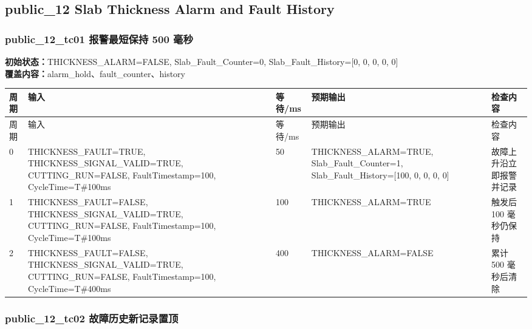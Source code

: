 \subsection{{\ttfamily public\_12} Slab Thickness Alarm and Fault History}

\subsubsection{{\ttfamily public\_12\_tc01} 报警最短保持 500 毫秒}

\noindent\textbf{初始状态：}THICKNESS\_ALARM=FALSE, Slab\_Fault\_Counter=0, Slab\_Fault\_History=[0, 0, 0, 0, 0]\\

\textbf{覆盖内容：}alarm\_hold、fault\_counter、history

\begin{longtable}{L{1.0cm}L{4.7cm}L{1.4cm}L{4.0cm}L{2.1cm}}

\toprule

周期 & 输入 & 等待/ms & 预期输出 & 检查内容\\

\midrule

\endfirsthead

\toprule

周期 & 输入 & 等待/ms & 预期输出 & 检查内容\\

\midrule

\endhead

0 & THICKNESS\_FAULT=TRUE, THICKNESS\_SIGNAL\_VALID=TRUE, CUTTING\_RUN=FALSE, FaultTimestamp=100, CycleTime=T\#100ms & 50 & THICKNESS\_ALARM=TRUE, Slab\_Fault\_Counter=1, Slab\_Fault\_History=[100, 0, 0, 0, 0] & 故障上升沿立即报警并记录\\

1 & THICKNESS\_FAULT=FALSE, THICKNESS\_SIGNAL\_VALID=TRUE, CUTTING\_RUN=FALSE, FaultTimestamp=100, CycleTime=T\#100ms & 100 & THICKNESS\_ALARM=TRUE & 触发后 100 毫秒仍保持\\

2 & THICKNESS\_FAULT=FALSE, THICKNESS\_SIGNAL\_VALID=TRUE, CUTTING\_RUN=FALSE, FaultTimestamp=100, CycleTime=T\#400ms & 400 & THICKNESS\_ALARM=FALSE & 累计 500 毫秒后清除\\

\bottomrule

\end{longtable}

\subsubsection{{\ttfamily public\_12\_tc02} 故障历史新记录置顶}

